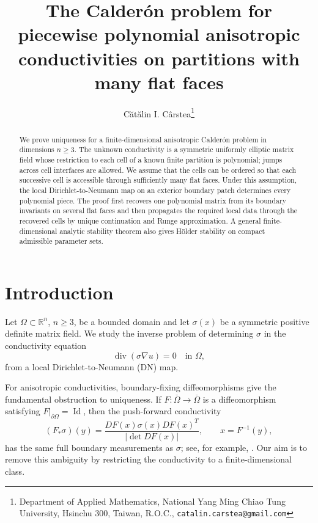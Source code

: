 \documentclass[11pt,oneside]{article}
\title{The Calder\'on problem for piecewise polynomial anisotropic conductivities on partitions with many flat faces}
\author{C\u{a}t\u{a}lin I. C\^{a}rstea\thanks{
Department of Applied Mathematics,
National Yang Ming Chiao Tung University,
Hsinchu 300, Taiwan, R.O.C.,
\texttt{catalin.carstea@gmail.com}}}
\date{}
\newcommand{\R}{\mathbb R}
\newcommand{\diver}{\operatorname{div}}
\newcommand{\Id}{\operatorname{Id}}
\begin{document}
\maketitle

\begin{abstract}
We prove uniqueness for a finite-dimensional anisotropic Calder\'on problem in
dimensions \(n\ge 3\).  The unknown conductivity is a symmetric uniformly
elliptic matrix field whose restriction to each cell of a known finite
partition is polynomial; jumps across cell interfaces are allowed.  We assume
that the cells can be ordered so that each successive cell is accessible
through sufficiently many flat faces.  Under this assumption, the local
Dirichlet-to-Neumann map on an exterior boundary patch determines every
polynomial piece.  The proof first recovers one polynomial matrix from its
boundary invariants on several flat faces and then propagates the required
local data through the recovered cells by unique continuation and Runge
approximation.  A general finite-dimensional analytic stability theorem also
gives H\"older stability on compact admissible parameter sets.
\end{abstract}




\section{Introduction}

Let \(\Omega\subset \R^n\), \(n\ge 3\), be a bounded domain and let
\(\sigma(x)\) be a symmetric positive definite matrix field.  We study the
inverse problem of determining \(\sigma\) in the conductivity equation
\begin{equation}
  \diver(\sigma \nabla u)=0\quad\text{in }\Omega,
  \label{eq:conductivity-equation}
\end{equation}
from a local Dirichlet-to-Neumann (DN) map.

For anisotropic conductivities, boundary-fixing diffeomorphisms give the
fundamental obstruction to uniqueness.  If
\(F:\overline\Omega\to\overline\Omega\) is a diffeomorphism satisfying
\(F|_{\partial\Omega}=\Id\), then the push-forward conductivity
\begin{equation}
  (F_*\sigma)(y)=
  \frac{DF(x)\sigma(x)DF(x)^T}{|\det DF(x)|},
  \qquad x=F^{-1}(y),
  \label{eq:gauge}
\end{equation}
has the same full boundary measurements as \(\sigma\); see, for example,
\cite{LassasUhlmann2001,LeeUhlmann1989,Sylvester1990}.  Our aim is to remove
this ambiguity by restricting the conductivity to a finite-dimensional class.
\end{document}
